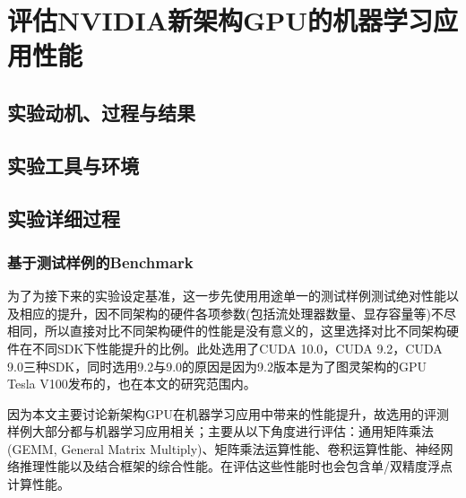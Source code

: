 \section{评估NVIDIA新架构GPU的机器学习应用性能}
\subsection{实验动机、过程与结果}
\subsection{实验工具与环境}
\subsection{实验详细过程}
\subsubsection{基于测试样例的Benchmark}
\par 为了为接下来的实验设定基准，这一步先使用用途单一的测试样例测试绝对性能以及相应的提升，因不同架构的硬件各项参数(包括流处理器数量、显存容量等)不尽相同，所以直接对比不同架构硬件的性能是没有意义的，这里选择对比不同架构硬件在不同SDK下性能提升的比例。此处选用了CUDA 10.0，CUDA 9.2，CUDA 9.0三种SDK，同时选用9.2与9.0的原因是因为9.2版本是为了图灵架构的GPU Tesla V100发布的\parencite{CUDA92}，也在本文的研究范围内。
\par 因为本文主要讨论新架构GPU在机器学习应用中带来的性能提升，故选用的评测样例大部分都与机器学习应用相关；主要从以下角度进行评估：通用矩阵乘法(GEMM, General Matrix Multiply)、矩阵乘法运算性能、卷积运算性能、神经网络推理性能以及结合框架的综合性能。在评估这些性能时也会包含单/双精度浮点计算性能。
